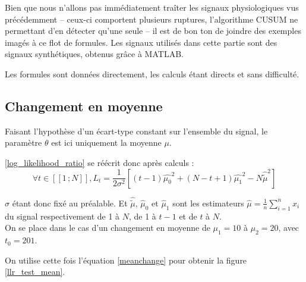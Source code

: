 \documentclass[french,11pt,notitlepage]{report}
\begin{document}
		Bien que nous n'allons pas immédiatement traîter les signaux physiologiques vus précédemment --
	ceux-ci comportent plusieurs ruptures, l'algorithme CUSUM ne permettant d'en détecter qu'une seule -- il est de bon ton de joindre des exemples imagés à ce flot de formules.
	Les signaux utilisés dans cette partie sont des signaux synthétiques, obtenus grâce à MATLAB.
	
		Les formules sont données directement, les calculs étant directs et sans difficulté.
		
	
	\subsection{Changement en moyenne}
	
	
	Faisant l'hypothèse d'un écart-type constant sur l'ensemble du signal, le paramètre $\theta$ est ici uniquement la moyenne $\mu$.
	
	\ref{log_likelihood_ratio} se réécrit donc après calculs :
	\begin{equation}
		\forall t \in [\![1\,; N]\!], L_t = \frac{1}{2 \sigma ^2}\left[(t-1)\hat{\mu_0}^2 + (N - t + 1)\hat{\mu_1}^2 - N\hat{\tilde\mu}^2 \right]
		\label{meanchange}
	\end{equation}
	
	$\sigma$ étant donc fixé au préalable. Et $\hat{\tilde\mu}$, $\hat\mu_0$ et $\hat\mu_1$ sont les estimateurs $\hat\mu=\frac1n\sum_{i=1}^nx_i$ du signal respectivement de 1 à $N$, de 1 à $t-1$ et de $t$ à $N$.
	\\
	
	On se place dans le cas d'un changement en moyenne de $\mu_1 = 10$ à $\mu_2 = 20$, avec $t_0 = 201$.
	
	On utilise cette fois l'équation \ref{meanchange} pour obtenir la figure \ref{llr_test_mean}.
\end{document}
